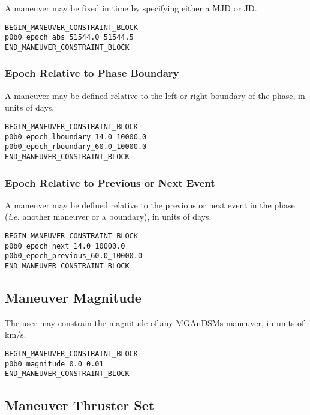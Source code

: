 \documentclass[11pt]{article}
\begin{document}
A maneuver may be fixed in time by specifying either a \ac{MJD} or \ac{JD}.

\begin{verbatim}
BEGIN_MANEUVER_CONSTRAINT_BLOCK
p0b0_epoch_abs_51544.0_51544.5
END_MANEUVER_CONSTRAINT_BLOCK
\end{verbatim}

\subsubsection{Epoch Relative to Phase Boundary}

A maneuver may be defined relative to the left or right boundary of the phase, in units of days.

\begin{verbatim}
BEGIN_MANEUVER_CONSTRAINT_BLOCK
p0b0_epoch_lboundary_14.0_10000.0
p0b0_epoch_rboundary_60.0_10000.0
END_MANEUVER_CONSTRAINT_BLOCK
\end{verbatim}

\subsubsection{Epoch Relative to Previous or Next Event}

A maneuver may be defined relative to the previous or next event in the phase (\textit{i.e.} another maneuver or a boundary), in units of days.

\begin{verbatim}
BEGIN_MANEUVER_CONSTRAINT_BLOCK
p0b0_epoch_next_14.0_10000.0
p0b0_epoch_previous_60.0_10000.0
END_MANEUVER_CONSTRAINT_BLOCK
\end{verbatim}


\subsection{Maneuver Magnitude}
\label{subsec:MGAnDSMs_constraintMagnitude}

The user may constrain the magnitude of any MGAnDSMs maneuver, in units of km/s.

\begin{verbatim}
BEGIN_MANEUVER_CONSTRAINT_BLOCK
p0b0_magnitude_0.0_0.01
END_MANEUVER_CONSTRAINT_BLOCK
\end{verbatim}

\subsection{Maneuver Thruster Set}
\label{subsec:MGAnDSMs_constrainThrusterSet}
\end{document}
